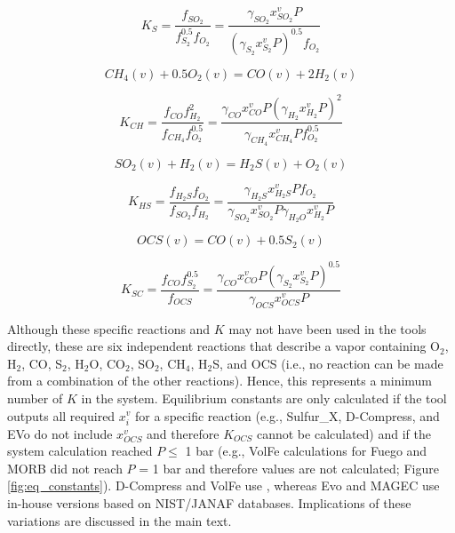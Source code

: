 \documentclass[draft, english]{volcanica-template}
\begin{document}
\begin{equation}
    K_S = \frac{f_{SO_2}}{f_{S_2}^{0.5}f_{O_2}}=\frac{\gamma_{SO_2}x^v_{SO_2}P}{\left ( \gamma_{S_2}x^v_{S_2}P \right )^{0.5} f_{O_2}}
\end{equation}

\begin{equation}
    CH_4(v) + 0.5O_2(v) = CO(v) + 2H_2(v)
\end{equation}

\begin{equation}
    K_{CH} = \frac{f_{CO}f^2_{H_2}}{f_{CH_4}f^{0.5}_{O_2}}=\frac{\gamma_{CO}x^v_{CO}P \left ( \gamma_{H_2}x^v_{H_2}P \right )^2}{\gamma_{CH_4}x^v_{CH_4}Pf^{0.5}_{O_2}}
\end{equation}

\begin{equation}
    SO_2(v) + H_2(v) = H_2S(v) + O_2(v)
\end{equation}

\begin{equation}
    K_{HS} = \frac{f_{H_2S}f_{O_2}}{f_{SO_2}f_{H_2}}=\frac{\gamma_{H_2S}x^v_{H_2S}Pf_{O_2}}{\gamma_{SO_2}x^v_{SO_2}P \gamma_{H_2O}x^v_{H_2}P}
\end{equation}

\begin{equation}
    OCS(v) = CO(v) + 0.5S_2(v)
\end{equation}

\begin{equation}
    K_{SC} = \frac{f_{CO}f^{0.5}_{S_2}}{f_{OCS}}=\frac{\gamma_{CO}x^v_{CO}P \left ( \gamma_{S_2}x^v_{S_2}P \right )^{0.5}}{\gamma_{OCS}x^v_{OCS}P}
\end{equation}

\noindent Although these specific reactions and $K$ may not have been used in the tools directly, these are six independent reactions that describe a vapor containing O$_2$, H$_2$, CO, S$_2$, H$_2$O, CO$_2$, SO$_2$, CH$_4$, H$_2$S, and OCS (i.e., no reaction can be made from a combination of the other reactions). Hence, this represents a minimum number of $K$ in the system. Equilibrium constants are only calculated if the tool outputs all required $x^v_i$ for a specific reaction (e.g., Sulfur\_X, D-Compress, and EVo do not include $x^v_{OCS}$ and therefore $K_{OCS}$ cannot be calculated) and if the system calculation reached $P \leq$ 1 bar (e.g., VolFe calculations for Fuego and MORB did not reach $P$ = 1 bar and therefore values are not calculated; Figure \ref{fig:eq_constants}). D-Compress and VolFe use \textcite{ohmoto1977}, whereas Evo and MAGEC use in-house versions based on NIST/JANAF databases. Implications of these variations are discussed in the main text.
\end{document}

